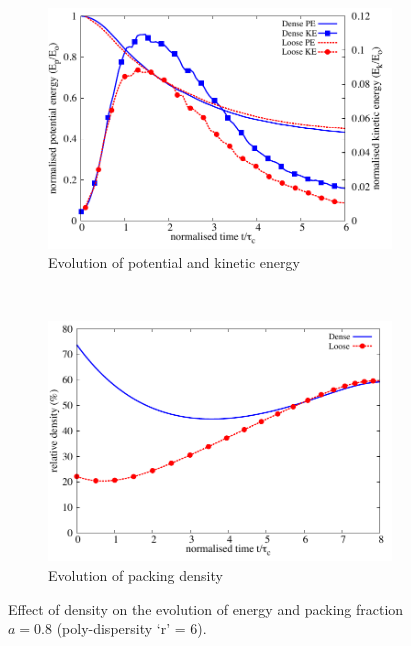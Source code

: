 \begin{figure}[tbhp]
\centering
\begin{subfigure}[b]{0.75\textwidth}
\centering
\includegraphics[width=\textwidth]{Energy_dense_r6}
\caption{Evolution of potential and kinetic energy}
\label{fig:Energy_dense_r6}
\end{subfigure}
\\
\begin{subfigure}[b]{0.75\textwidth}
\centering
\includegraphics[width=\textwidth]{voro_r6}
\caption{Evolution of packing density}
\label{fig:voro_r6}
\end{subfigure}
\caption{Effect of density on the evolution of energy and packing fraction $a = 
0.8$ (poly-dispersity `r' = 6).}
\label{fig:Energy_voro_r6}
\end{figure}

